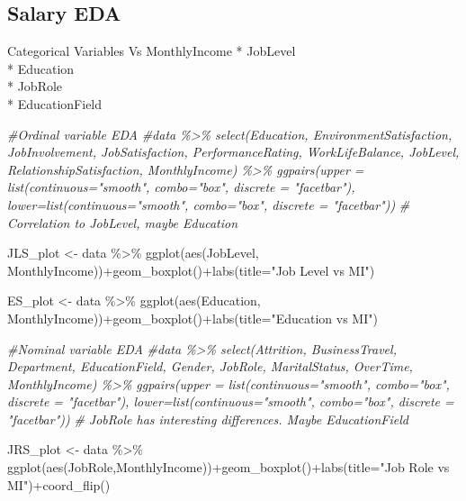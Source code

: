 \documentclass[
]{article}
\newenvironment{Shaded}{\begin{snugshade}}{\end{snugshade}}
\newcommand{\AttributeTok}[1]{\textcolor[rgb]{0.77,0.63,0.00}{#1}}
\newcommand{\CommentTok}[1]{\textcolor[rgb]{0.56,0.35,0.01}{\textit{#1}}}
\newcommand{\FunctionTok}[1]{\textcolor[rgb]{0.00,0.00,0.00}{#1}}
\newcommand{\NormalTok}[1]{#1}
\newcommand{\OtherTok}[1]{\textcolor[rgb]{0.56,0.35,0.01}{#1}}
\newcommand{\SpecialCharTok}[1]{\textcolor[rgb]{0.00,0.00,0.00}{#1}}
\newcommand{\StringTok}[1]{\textcolor[rgb]{0.31,0.60,0.02}{#1}}
\begin{document}
\hypertarget{salary-eda}{%
\subsection{Salary EDA}\label{salary-eda}}

Categorical Variables Vs MonthlyIncome * JobLevel\\
* Education\\
* JobRole\\
* EducationField

\begin{Shaded}
\begin{Highlighting}[]
\CommentTok{\#Ordinal variable EDA}
\CommentTok{\#data \%\textgreater{}\% select(Education, EnvironmentSatisfaction, JobInvolvement, JobSatisfaction, PerformanceRating, WorkLifeBalance, JobLevel, RelationshipSatisfaction, MonthlyIncome) \%\textgreater{}\% ggpairs(upper = list(continuous="smooth", combo="box", discrete = "facetbar"), lower=list(continuous="smooth", combo="box", discrete = "facetbar"))}
\CommentTok{\# Correlation to JobLevel, maybe Education}

\NormalTok{JLS\_plot }\OtherTok{\textless{}{-}}\NormalTok{ data }\SpecialCharTok{\%\textgreater{}\%} \FunctionTok{ggplot}\NormalTok{(}\FunctionTok{aes}\NormalTok{(JobLevel, MonthlyIncome))}\SpecialCharTok{+}\FunctionTok{geom\_boxplot}\NormalTok{()}\SpecialCharTok{+}\FunctionTok{labs}\NormalTok{(}\AttributeTok{title=}\StringTok{"Job Level vs MI"}\NormalTok{)}

\NormalTok{ES\_plot }\OtherTok{\textless{}{-}}\NormalTok{ data }\SpecialCharTok{\%\textgreater{}\%} \FunctionTok{ggplot}\NormalTok{(}\FunctionTok{aes}\NormalTok{(Education, MonthlyIncome))}\SpecialCharTok{+}\FunctionTok{geom\_boxplot}\NormalTok{()}\SpecialCharTok{+}\FunctionTok{labs}\NormalTok{(}\AttributeTok{title=}\StringTok{"Education vs MI"}\NormalTok{)}

\CommentTok{\#Nominal variable EDA}
\CommentTok{\#data \%\textgreater{}\% select(Attrition, BusinessTravel, Department, EducationField, Gender, JobRole, MaritalStatus, OverTime, MonthlyIncome) \%\textgreater{}\% ggpairs(upper = list(continuous="smooth", combo="box", discrete = "facetbar"), lower=list(continuous="smooth", combo="box", discrete = "facetbar"))}
\CommentTok{\# JobRole has interesting differences.  Maybe EducationField}

\NormalTok{JRS\_plot }\OtherTok{\textless{}{-}}\NormalTok{ data }\SpecialCharTok{\%\textgreater{}\%} \FunctionTok{ggplot}\NormalTok{(}\FunctionTok{aes}\NormalTok{(JobRole,MonthlyIncome))}\SpecialCharTok{+}\FunctionTok{geom\_boxplot}\NormalTok{()}\SpecialCharTok{+}\FunctionTok{labs}\NormalTok{(}\AttributeTok{title=}\StringTok{"Job Role vs MI"}\NormalTok{)}\SpecialCharTok{+}\FunctionTok{coord\_flip}\NormalTok{()}


\end{Highlighting}
\end{Shaded}
\end{document}
